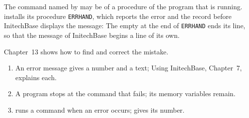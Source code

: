 The command named by  may be  of a procedure of the program
that is running.   installs its procedure \texttt{ERRHAND},
which reports the error and the record before InitechBase displays the
message:
The empty  at the end of \texttt{ERRHAND} ends its line, so that the
message of InitechBase begins a line of its own.

Chapter~13 shows how to find and correct the mistake.

\begin{enumerate}
\item An error message gives a number and a text; Using InitechBase, Chapter~7,
  explains each.
\item A program stops at the command that fails; its memory variables remain.
\item {}  runs a command when an error occurs;
   gives its number.
\end{enumerate}
